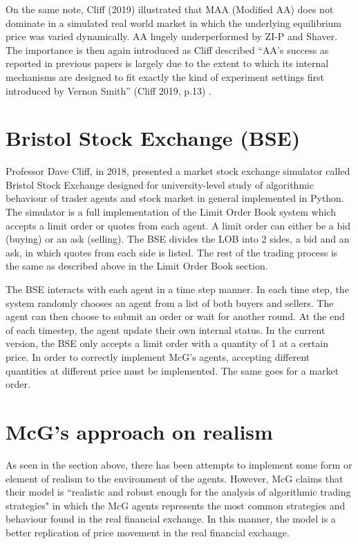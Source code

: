 On the same note, Cliff (2019) illustrated that MAA (Modified AA) does not dominate in a simulated real world market in which the underlying equilibrium price was varied dynamically. AA hugely underperformed by ZI-P and Shaver. The importance is then again introduced as Cliff described ``AA’s success as reported in previous papers is largely due to the extent to which its internal mechanisms are designed to fit exactly the kind of experiment settings first introduced by Vernon Smith” (Cliff 2019, p.13) \cite{dcliff2013}. 

\section{Bristol Stock Exchange (BSE)}
Professor Dave Cliff, in 2018, presented a market stock exchange simulator called Bristol Stock Exchange designed for university-level study of algorithmic behaviour of trader agents and stock market in general implemented in Python. The simulator is a full implementation of the Limit Order Book system which accepts a limit order or quotes from each agent. A limit order can either be a bid (buying) or an ask (selling). The BSE divides the LOB into 2 sides, a bid and an ask, in which quotes from each side is listed. The rest of the trading process is the same as described above in the Limit Order Book section. 

The BSE interacts with each agent in a time step manner. In each time step, the system randomly chooses an agent from a list of both buyers and sellers. The agent can then choose to submit an order or wait for another round. At the end of each timestep, the agent update their own internal status. In the current version, the BSE only accepts a limit order with a quantity of 1 at a certain price. In order to correctly implement McG’s agents, accepting different quantities at different price must be implemented. The same goes for a market order. 

\section{McG's approach on realism}
As seen in the section above, there has been attempts to implement some form or element of realism to the environment of the agents. However, McG claims that their model is ``realistic and robust enough for the analysis of algorithmic trading strategies"\cite{McGroarty} in which the McG agents represents the most common strategies and behaviour found in the real financial exchange. In this manner, the model is a better replication of price movement in the real financial exchange. 

